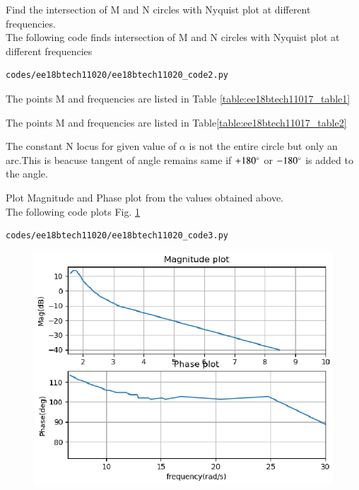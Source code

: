 \item
Find the intersection of M and N circles with Nyquist plot at different frequencies. \\
\solution 
The following code finds intersection of M and N circles with Nyquist plot at different frequencies
\begin{lstlisting}
codes/ee18btech11020/ee18btech11020_code2.py
\end{lstlisting}

The points M and frequencies are listed in Table  \ref{table:ee18btech11017_table1}
\begin{table}[!ht]
\centering

\caption{}
\label{table:ee18btech11020_table1}
\end{table}


The points M and frequencies are listed in Table\ref{table:ee18btech11017_table2}
\begin{table}[!ht]
\centering

\caption{}
\label{table:ee18btech11020_table2}
\end{table}

The constant N locus for given value of $\alpha$ is not the entire circle but only an arc.This is beacuse tangent of angle remains same if $+180\degree$ or 
$-180\degree$ is added to the angle.



\item
Plot Magnitude and Phase plot from the values obtained above.\\
\solution
The following code plots Fig. \ref{fig:ee18btech11020_fig2}
\begin{lstlisting}
codes/ee18btech11020/ee18btech11020_code3.py
\end{lstlisting}

\begin{figure}[!h]
  \includegraphics[width=\columnwidth]{./figs/ee18btech11020/Figure_2.eps}
 \caption{}
  \label{fig:ee18btech11020_fig2}
\end{figure}


